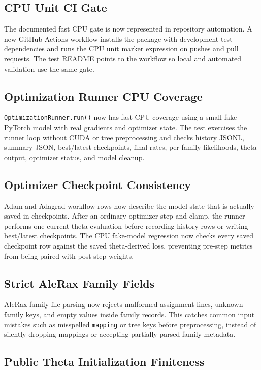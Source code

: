 \documentclass[11pt]{article}
\begin{document}
\subsection{CPU Unit CI Gate}

The documented fast CPU gate is now represented in repository automation.
A new GitHub Actions workflow installs the package with development test
dependencies and runs the CPU unit marker expression on pushes and pull
requests.  The test README points to the workflow so local and automated
validation use the same gate.

\subsection{Optimization Runner CPU Coverage}

\texttt{OptimizationRunner.run()} now has fast CPU coverage using a small fake
PyTorch model with real gradients and optimizer state.  The test exercises the
runner loop without CUDA or tree preprocessing and checks history JSONL,
summary JSON, best/latest checkpoints, final rates, per-family likelihoods,
theta output, optimizer status, and model cleanup.

\subsection{Optimizer Checkpoint Consistency}

Adam and Adagrad workflow rows now describe the model state that is actually
saved in checkpoints.  After an ordinary optimizer step and clamp, the runner
performs one current-theta evaluation before recording history rows or writing
best/latest checkpoints.  The CPU fake-model regression now checks every saved
checkpoint row against the saved theta-derived loss, preventing pre-step metrics
from being paired with post-step weights.

\subsection{Strict AleRax Family Fields}

AleRax family-file parsing now rejects malformed assignment lines, unknown
family keys, and empty values inside family records.  This catches common input
mistakes such as misspelled \texttt{mapping} or tree keys before preprocessing,
instead of silently dropping mappings or accepting partially parsed family
metadata.

\subsection{Public Theta Initialization Finiteness}
\end{document}
